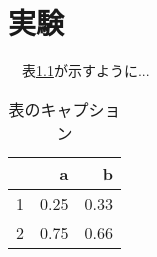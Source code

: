 \chapter{実験}
　表\ref{table1}が示すように...\\

\begin{table}[h]
    \centering
    \begin{tabular}{r|rr}
    & a & b\\ \hline
    1& 0.25 & 0.33\\
    2& 0.75 & 0.66\\
    \end{tabular}
    \caption{表のキャプション}
    \label{table1}
\end{table}
